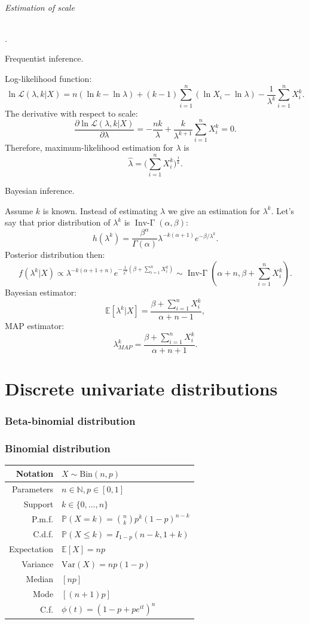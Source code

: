 \documentclass[a4paper,11pt]{article}
\theoremstyle{plain}
\theoremstyle{definition}
\newcommand{\ME}{\mathbb{E}}
\newcommand{\MP}{\mathbb{P}}
\newcommand{\MN}{\mathbb{N}}
\newcommand{\Var}{\mathrm{Var}}
\begin{document}
\paragraph{Estimation of scale}.
\subparagraph{Frequentist inference.} Log-likelihood function:
\[
\ln \mathcal{L}(\lambda, k|X) = n (\ln k - \ln \lambda) + (k-1)\sum_{i=1}^{n}(\ln X_i - \ln \lambda) - \frac{1}{\lambda^k}\sum_{i=1}^{n} X_i^k.
\]
The derivative with respect to scale:
\[
\frac{\partial\ln \mathcal{L}(\lambda, k|X) }{\partial \lambda} = -\frac{n k}{\lambda} + \frac{k}{\lambda^{k+1}} \sum_{i=1}^{n} X_i^k=0.
\]
Therefore, maximum-likelihood estimation for $\lambda$ is
\[
\hat{\lambda} = \bigg(\sum_{i=1}^{n}X_i^k\bigg)^{\frac{1}{k}}.
\]
\subparagraph{Bayesian inference.} Assume $k$ is known. Instead of estimating $\lambda$ we give an estimation for $\lambda^k$. Let's say that prior distribution of $\lambda^k$ is $\operatorname{Inv-\Gamma}(\alpha, \beta)$:
\[
h(\lambda^k) = \frac{\beta^\alpha}{\Gamma(\alpha)} \lambda^{-k(\alpha+1)} e^{-\beta / \lambda^k}.
\]
Posterior distribution then:
\[
f(\lambda^k| X) \propto \lambda^{-k(\alpha+1+n)} e^{-\frac{1}{\lambda^k} (\beta+\sum_{i=1}^{n}X_i^k)} \sim \operatorname{Inv-\Gamma}(\alpha+n, \beta+\sum_{i=1}^{n}X_i^k).
\]
Bayesian estimator:
\[
\ME[\lambda^k|X] = \frac{\beta+\sum_{i=1}^{n}X_i^k}{\alpha+n-1},
\]
MAP estimator:
\[
\lambda_{MAP}^k = \frac{\beta+\sum_{i=1}^{n}X_i^k}{\alpha+n+1}.
\]

	\pagebreak
	\part{Discrete univariate distributions}
	\section{Beta-binomial distribution}
	\section{Binomial distribution}
	\begin{center}
		\begin{tabular}{| r | l |}
			\hline
			Notation & $ X \sim \mathrm{Bin}(n, p) $ \\
			\hline
			Parameters & $ n \in \MN, p \in [0, 1]  $ \\
			\hline
			Support & $ k \in \{0, \dots, n  \} $  \\
			\hline
			P.m.f. & $\MP(X = k) = \binom{n}{k} p^k (1-p)^{n-k}  $ \\
			\hline
			C.d.f. & $\MP(X \leq k)=I_{1-p}(n-k, 1+k) $ \\
			\hline
			Expectation & $\ME[X] = np$ \\
			\hline
			Variance & $\Var(X) = np(1-p)$ \\
			\hline
			Median & $[np]$ \\
			\hline
			Mode & $[(n+1)p]$ \\
			\hline
			C.f. & $\phi(t) = (1-p+pe^{it})^n  $ \\
			\hline
		\end{tabular}
	\end{center}
\end{document}
